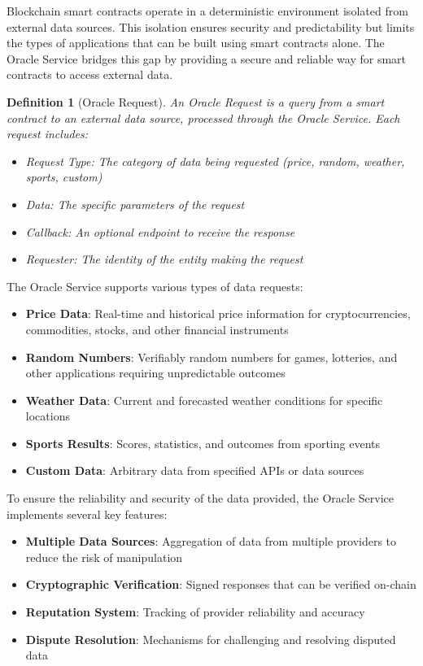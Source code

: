\documentclass{article}
\newtheorem{definition}{Definition}
\begin{document}
Blockchain smart contracts operate in a deterministic environment isolated from external data sources. This isolation ensures security and predictability but limits the types of applications that can be built using smart contracts alone. The Oracle Service bridges this gap by providing a secure and reliable way for smart contracts to access external data.



\begin{definition}[Oracle Request]
An Oracle Request is a query from a smart contract to an external data source, processed through the Oracle Service. Each request includes:
\begin{itemize}
    \item Request Type: The category of data being requested (price, random, weather, sports, custom)
    \item Data: The specific parameters of the request
    \item Callback: An optional endpoint to receive the response
    \item Requester: The identity of the entity making the request
\end{itemize}
\end{definition}

The Oracle Service supports various types of data requests:

\begin{itemize}
    \item \textbf{Price Data}: Real-time and historical price information for cryptocurrencies, commodities, stocks, and other financial instruments
    \item \textbf{Random Numbers}: Verifiably random numbers for games, lotteries, and other applications requiring unpredictable outcomes
    \item \textbf{Weather Data}: Current and forecasted weather conditions for specific locations
    \item \textbf{Sports Results}: Scores, statistics, and outcomes from sporting events
    \item \textbf{Custom Data}: Arbitrary data from specified APIs or data sources
\end{itemize}

To ensure the reliability and security of the data provided, the Oracle Service implements several key features:

\begin{itemize}
    \item \textbf{Multiple Data Sources}: Aggregation of data from multiple providers to reduce the risk of manipulation
    \item \textbf{Cryptographic Verification}: Signed responses that can be verified on-chain
    \item \textbf{Reputation System}: Tracking of provider reliability and accuracy
    \item \textbf{Dispute Resolution}: Mechanisms for challenging and resolving disputed data
\end{itemize}
\end{document}
